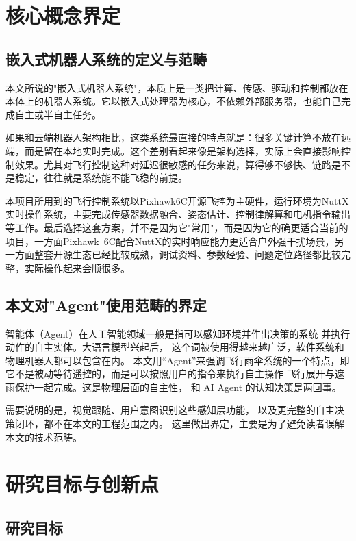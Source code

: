 \section{核心概念界定}

\subsection{嵌入式机器人系统的定义与范畴}

本文所说的"嵌入式机器人系统"，本质上是一类把计算、传感、驱动和控制都放在本体上的机器人系统。它以嵌入式处理器为核心，不依赖外部服务器，也能自己完成自主或半自主任务。

如果和云端机器人架构相比，这类系统最直接的特点就是：很多关键计算不放在远端，而是留在本地实时完成。这个差别看起来像是架构选择，实际上会直接影响控制效果。尤其对飞行控制这种对延迟很敏感的任务来说，算得够不够快、链路是不是稳定，往往就是系统能不能飞稳的前提\cite{quanquan2017}。

本项目所用到的飞行控制系统以Pixhawk6C开源飞控为主硬件，运行环境为NuttX实时操作系统，主要完成传感器数据融合、姿态估计、控制律解算和电机指令输出等工作。最后选择这套方案，并不是因为它"常用"，而是因为它的确更适合当前的项目，一方面Pixhawk~6C配合NuttX的实时响应能力更适合户外强干扰场景，另一方面整套开源生态已经比较成熟，调试资料、参数经验、问题定位路径都比较完整，实际操作起来会顺很多。

\subsection{本文对"Agent"使用范畴的界定}

智能体（Agent）在人工智能领域一般是指可以感知环境并作出决策的系统
并执行动作的自主实体\cite{russell2020}。大语言模型兴起后，
这个词被使用得越来越广泛，软件系统和物理机器人都可以包含在内。
本文用“Agent”来强调飞行雨伞系统的一个特点，即
它不是被动等待遥控的，而是可以按照用户的指令来执行自主操作
飞行展开与遮雨保护一起完成。这是物理层面的自主性，
和 AI Agent 的认知决策是两回事。

需要说明的是，视觉跟随、用户意图识别这些感知层功能，
以及更完整的自主决策闭环，都不在本文的工程范围之内。
这里做出界定，主要是为了避免读者误解本文的技术范畴。


\section{研究目标与创新点}

\subsection{研究目标}

